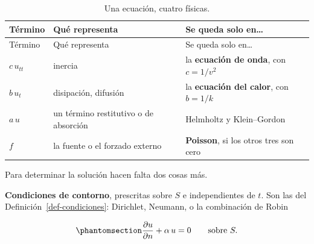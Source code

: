 \documentclass[
  spanish,
  a4paper,
]{scrbook}
\theoremstyle{definition}
\theoremstyle{plain}
\theoremstyle{definition}
\theoremstyle{plain}
\theoremstyle{definition}
\theoremstyle{remark}
\begin{document}
\begin{longtable}[]{@{}
  >{\raggedright\arraybackslash}p{}
  >{\raggedright\arraybackslash}p{}
  >{\raggedright\arraybackslash}p{}@{}}
\caption{Una ecuación, cuatro
físicas.}\label{tbl-terminos}\tabularnewline
\toprule\noalign{}
\begin{minipage}[b]{\linewidth}\raggedright
Término
\end{minipage} & \begin{minipage}[b]{\linewidth}\raggedright
Qué representa
\end{minipage} & \begin{minipage}[b]{\linewidth}\raggedright
Se queda solo en\ldots{}
\end{minipage} \\
\midrule\noalign{}
\endfirsthead
\toprule\noalign{}
\begin{minipage}[b]{\linewidth}\raggedright
Término
\end{minipage} & \begin{minipage}[b]{\linewidth}\raggedright
Qué representa
\end{minipage} & \begin{minipage}[b]{\linewidth}\raggedright
Se queda solo en\ldots{}
\end{minipage} \\
\midrule\noalign{}
\endhead
\bottomrule\noalign{}
\endlastfoot
\(c\,u_{tt}\) & inercia & la \textbf{ecuación de onda}, con
\(c = 1/v^2\) \\
\(b\,u_t\) & disipación, difusión & la \textbf{ecuación del calor}, con
\(b = 1/k\) \\
\(a\,u\) & un término restitutivo o de absorción & Helmholtz y
Klein--Gordon \\
\(f\) & la fuente o el forzado externo & \textbf{Poisson}, si los otros
tres son cero \\
\end{longtable}

Para determinar la solución hacen falta dos cosas más.

\textbf{Condiciones de contorno}, prescritas sobre \(S\) e
independientes de \(t\). Son las del Definición~\ref{def-condiciones}:
Dirichlet, Neumann, o la combinación de Robin

\begin{equation}\protect\phantomsection\label{eq-robin-t}{
\frac{\partial u}{\partial n} + \alpha\,u = 0 \qquad\text{sobre } S .
}\end{equation}
\end{document}

